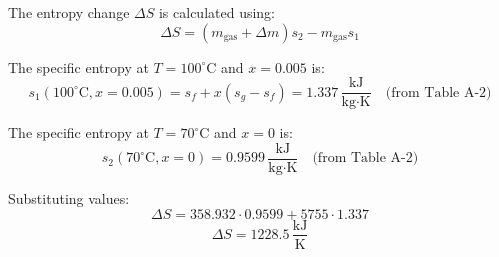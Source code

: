 The entropy change \( \Delta S \) is calculated using:  
\[
\Delta S = (m_{\text{gas}} + \Delta m) s_2 - m_{\text{gas}} s_1
\]  

The specific entropy at \( T = 100^\circ\text{C} \) and \( x = 0.005 \) is:  
\[
s_1(100^\circ\text{C}, x = 0.005) = s_f + x(s_g - s_f) = 1.337 \, \frac{\text{kJ}}{\text{kg·K}} \quad \text{(from Table A-2)}
\]  

The specific entropy at \( T = 70^\circ\text{C} \) and \( x = 0 \) is:  
\[
s_2(70^\circ\text{C}, x = 0) = 0.9599 \, \frac{\text{kJ}}{\text{kg·K}} \quad \text{(from Table A-2)}
\]  

Substituting values:  
\[
\Delta S = 358.932 \cdot 0.9599 + 5755 \cdot 1.337
\]  
\[
\Delta S = 1228.5 \, \frac{\text{kJ}}{\text{K}}
\]